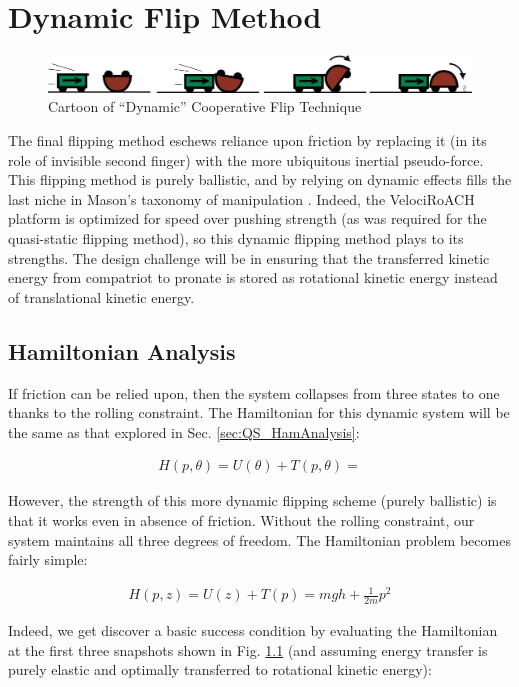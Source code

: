 \documentclass[letterpaper]{report}
\begin{document}
\chapter{Dynamic Flip Method}
\begin{figure}[ht]
\centering
\includegraphics[width=1.0\textwidth]{Dynamic_CoopCartoon.png}
\caption{Cartoon of ``Dynamic'' Cooperative Flip Technique \label{fig:DynCartoon}}
\end{figure}
The final flipping method eschews reliance upon friction by replacing it (in its role of invisible second finger) with the more ubiquitous inertial pseudo-force.
This flipping method is purely ballistic, and by relying on dynamic effects fills the last niche in Mason's taxonomy of manipulation \cite{MasonMORMBook}.
Indeed, the VelociRoACH platform is optimized for speed over pushing strength (as was required for the quasi-static flipping method), so this dynamic flipping method plays to its strengths.
The design challenge will be in ensuring that the transferred kinetic energy from compatriot to pronate is stored as rotational kinetic energy instead of translational kinetic energy.

\section{Hamiltonian Analysis}
If friction can be relied upon, then the system collapses from three states to one thanks to the rolling constraint.
The Hamiltonian for this dynamic system will be the same as that explored in Sec. \ref{sec:QS_HamAnalysis}:

\begin{align}
  H(p,\theta) = U(\theta) + T(p,\theta) =
\end{align}

However, the strength of this more dynamic flipping scheme (purely ballistic) is that it works even in absence of friction.
Without the rolling constraint, our system maintains all three degrees of freedom.
The Hamiltonian problem becomes fairly simple:

\begin{align}
  H(p,z) = U(z) + T(p) = m g h + \frac{1}{2 m} p^2
\end{align}

Indeed, we get discover a basic success condition by evaluating the Hamiltonian at the first three snapshots shown in Fig. \ref{fig:DynCartoon} (and assuming energy transfer is purely elastic and optimally transferred to rotational kinetic energy):
\end{document}
